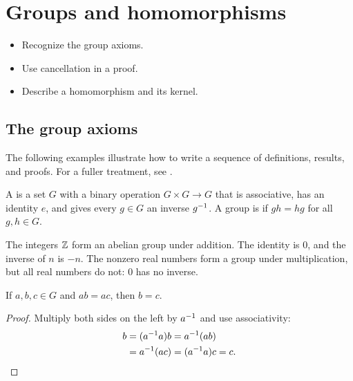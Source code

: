 \documentclass[../../main.tex]{subfiles}
\begin{document}
\chapter{Groups and homomorphisms}
\label{ch:groups}

\begin{objectives}
\begin{itemize}
  \item Recognize the group axioms.
  \item Use cancellation in a proof.
  \item Describe a homomorphism and its kernel.
\end{itemize}
\end{objectives}

\section{The group axioms}
The following examples illustrate how to write a sequence of definitions,
results, and proofs. For a fuller treatment, see \textcite{judson2020}.

\begin{definition}[Group]\label{def:group}
A  is a set $G$ with a binary operation $G\times G\to G$
that is associative, has an identity $e$, and gives every $g\in G$ an
inverse $g^{-1}$. A group is  if $gh=hg$ for all $g,h\in G$.
\end{definition}

\begin{eg}
The integers $\mathbb Z$ form an abelian group under addition. The identity is
$0$, and the inverse of $n$ is $-n$. The nonzero real numbers form a group
under multiplication, but all real numbers do not: $0$ has no inverse.
\end{eg}

\begin{lemma}[Cancellation]\label{lem:cancellation}
If $a,b,c\in G$ and $ab=ac$, then $b=c$.
\end{lemma}
\begin{proof}
Multiply both sides on the left by $a^{-1}$ and use associativity:
\[
\begin{aligned}
  b&=(a^{-1} a)b=a^{-1}(ab)\\
   &=a^{-1}(ac)=(a^{-1} a)c=c.
\end{aligned}
\]
\end{proof}
\end{document}
